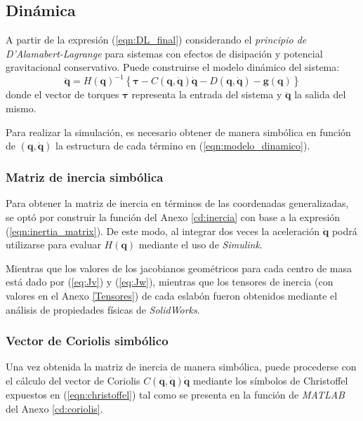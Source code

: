 \subsection{Dinámica}
    \noindent A partir de la expresión (\ref{eqn:DL_final}) considerando el \emph{principio de D'Alamabert-Lagrange} para sistemas con efectos de
    disipación y potencial gravitacional conservativo. Puede construirse el modelo dinámico del sistema:
    \begin{equation}
        \label{eqn:modelo_dinamico}
        \boldsymbol{\ddot{q}} =H(\boldsymbol{q})^{-1} \left \{ \boldsymbol{\boldsymbol{\tau}} - C(\boldsymbol{q}, \boldsymbol{\dot{q}}) \boldsymbol{\dot{q}}
        - D(\boldsymbol{q}, \boldsymbol{\dot{q}}) - \boldsymbol{g}(\boldsymbol{q}) \right \}
    \end{equation}
    donde el vector de torques $\boldsymbol{\tau}$ representa la entrada del sistema y $\boldsymbol{\ddot{q}}$ la salida del mismo. 
    
    Para realizar la simulación, es necesario obtener de manera simbólica en función de $(\boldsymbol{q}, \boldsymbol{\dot{q}})$ la estructura
    de cada término en (\ref{eqn:modelo_dinamico}). 

    \subsubsection{Matriz de inercia simbólica}
    \noindent Para obtener la matriz de inercia en términos de las coordenadas generalizadas, se optó por construir la función del Anexo \ref{cd:inercia} con base a la expresión
    (\ref{eqn:inertia_matrix}). De este modo, al integrar dos veces la aceleración $\boldsymbol{\ddot{q}}$ podrá utilizarse para evaluar $H(\boldsymbol{q})$
    mediante el uso de \emph{Simulink}. 

    Mientras que los valores de los jacobianos geométricos para cada centro de masa está dado por (\ref{eq:Jv}) y (\ref{eq:Jw}), mientras que los tensores de inercia (con valores
    en el Anexo \ref{Tensores}) de cada eslabón fueron obtenidos mediante el análisis de propiedades físicas de \emph{SolidWorks}.

    \subsubsection{Vector de Coriolis simbólico}
    \noindent Una vez obtenida la matriz de inercia de manera simbólica, puede procederse con el cálculo del vector de Coriolis $C(\boldsymbol{q}, \boldsymbol{\dot{q}})\boldsymbol{\dot{q}}$ mediante
    los símbolos de Christoffel expuestos en (\ref{eqn:christoffel}) tal como se presenta en la función de \emph{MATLAB} del Anexo \ref{cd:coriolis}. 

